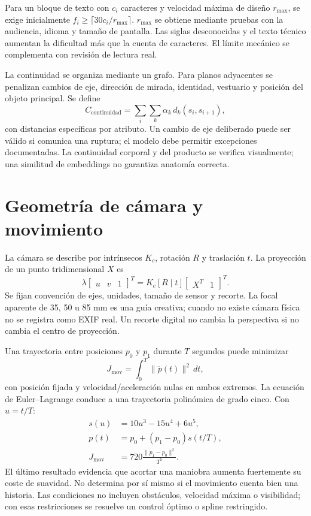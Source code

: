 Para un bloque de texto con $c_i$ caracteres y velocidad máxima de diseño $r_{\max}$, se exige inicialmente $f_i\geq\lceil30c_i/r_{\max}\rceil$. $r_{\max}$ se obtiene mediante pruebas con la audiencia, idioma y tamaño de pantalla. Las siglas desconocidas y el texto técnico aumentan la dificultad más que la cuenta de caracteres. El límite mecánico se complementa con revisión de lectura real.

La continuidad se organiza mediante un grafo. Para planos adyacentes se penalizan cambios de eje, dirección de mirada, identidad, vestuario y posición del objeto principal. Se define
\begin{equation}
 C_{\mathrm{continuidad}}=\sum_i\sum_k\alpha_k\,d_k(s_i,s_{i+1}),
\end{equation}
con distancias específicas por atributo. Un cambio de eje deliberado puede ser válido si comunica una ruptura; el modelo debe permitir excepciones documentadas. La continuidad corporal y del producto se verifica visualmente; una similitud de embeddings no garantiza anatomía correcta.

\section{Geometría de cámara y movimiento}
La cámara se describe por intrínsecos $K_c$, rotación $R$ y traslación $t$. La proyección de un punto tridimensional $X$ es
\begin{equation}
 \lambda\begin{bmatrix}u&v&1\end{bmatrix}^{T}=K_c[R\mid t]\begin{bmatrix}X^T&1\end{bmatrix}^{T}.
\end{equation}
Se fijan convención de ejes, unidades, tamaño de sensor y recorte. La focal aparente de 35, 50 u 85 mm es una guía creativa; cuando no existe cámara física no se registra como EXIF real. Un recorte digital no cambia la perspectiva si no cambia el centro de proyección.

Una trayectoria entre posiciones $p_0$ y $p_1$ durante $T$ segundos puede minimizar
\begin{equation}
 J_{\mathrm{mov}}=\int_0^T\|\dddot p(t)\|^2\,dt,
\end{equation}
con posición fijada y velocidad/aceleración nulas en ambos extremos. La ecuación de Euler--Lagrange conduce a una trayectoria polinómica de grado cinco. Con $u=t/T$:
\begin{align}
 s(u)&=10u^3-15u^4+6u^5,\\
 p(t)&=p_0+(p_1-p_0)s(t/T),\\
 J_{\mathrm{mov}}&=720\frac{\|p_1-p_0\|^2}{T^5}.
\end{align}
El último resultado evidencia que acortar una maniobra aumenta fuertemente su coste de suavidad. No determina por sí mismo si el movimiento cuenta bien una historia. Las condiciones no incluyen obstáculos, velocidad máxima o visibilidad; con esas restricciones se resuelve un control óptimo o spline restringido.

